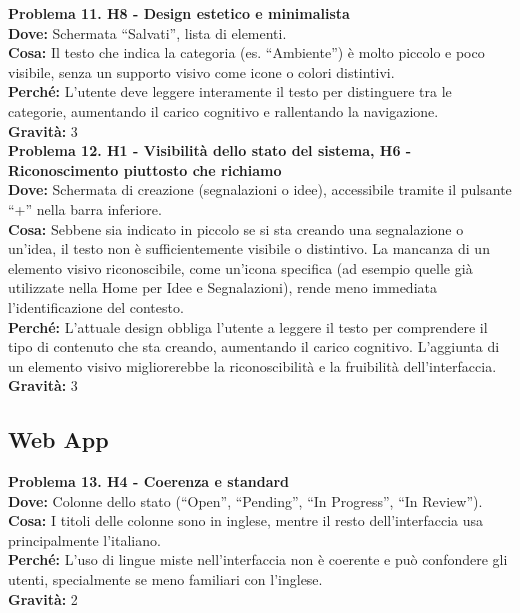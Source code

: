 \documentclass[a4paper,12pt]{article}
\begin{document}
\textbf{Problema 11. H8 - Design estetico e minimalista} \\
\textbf{Dove:} Schermata “Salvati”, lista di elementi. \\
\textbf{Cosa:} Il testo che indica la categoria (es. “Ambiente”) è molto piccolo e poco visibile, senza un supporto visivo come icone o colori distintivi. \\
\textbf{Perché:} L’utente deve leggere interamente il testo per distinguere tra le categorie, aumentando il carico cognitivo e rallentando la navigazione. \\
\textbf{Gravità:} 3 \\[1em]

\textbf{Problema 12. H1 - Visibilità dello stato del sistema, H6 - Riconoscimento piuttosto che richiamo} \\
\textbf{Dove:} Schermata di creazione (segnalazioni o idee), accessibile tramite il pulsante “+” nella barra inferiore. \\
\textbf{Cosa:} Sebbene sia indicato in piccolo se si sta creando una segnalazione o un’idea, il testo non è sufficientemente visibile o distintivo. La mancanza di un elemento visivo riconoscibile, come un’icona specifica (ad esempio quelle già utilizzate nella Home per Idee e Segnalazioni), rende meno immediata l’identificazione del contesto. \\
\textbf{Perché:} L’attuale design obbliga l’utente a leggere il testo per comprendere il tipo di contenuto che sta creando, aumentando il carico cognitivo. L’aggiunta di un elemento visivo migliorerebbe la riconoscibilità e la fruibilità dell’interfaccia. \\
\textbf{Gravità:} 3 \\[1em]


\subsection*{Web App}

\textbf{Problema 13. H4 - Coerenza e standard} \\
\textbf{Dove:} Colonne dello stato (“Open”, “Pending”, “In Progress”, “In Review”). \\
\textbf{Cosa:} I titoli delle colonne sono in inglese, mentre il resto dell’interfaccia usa principalmente l’italiano. \\
\textbf{Perché:} L’uso di lingue miste nell’interfaccia non è coerente e può confondere gli utenti, specialmente se meno familiari con l’inglese. \\
\textbf{Gravità:} 2 \\[1em]
\end{document}
